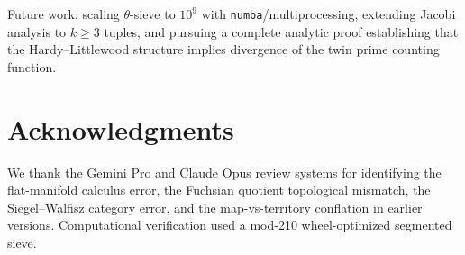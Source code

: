 \documentclass[12pt]{article}
\begin{document}
Future work: scaling $\theta$-sieve to $10^9$ with \texttt{numba}/multiprocessing,
extending Jacobi analysis to $k \geq 3$ tuples, and pursuing a complete analytic
proof establishing that the Hardy--Littlewood structure implies divergence of the
twin prime counting function.

\section*{Acknowledgments}

We thank the Gemini Pro and Claude Opus review systems for identifying the
flat-manifold calculus error, the Fuchsian quotient topological mismatch, the
Siegel--Walfisz category error, and the map-vs-territory conflation in earlier
versions. Computational verification used a mod-210 wheel-optimized segmented sieve.
\end{document}
